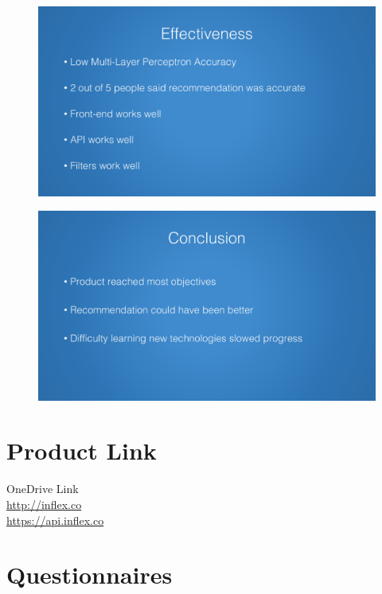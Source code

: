 \documentclass[a4paper,12pt]{report}
\begin{document}
\begin{appendices}
    \begin{figure}[h]
      \centering
      \includegraphics[width=0.9\linewidth]{presentation-8}
    \end{figure}

    \begin{figure}[h]
      \centering
      \includegraphics[width=0.9\linewidth]{presentation-9}
    \end{figure}

  \chapter{Product Link}
    OneDrive Link\\
    \url{http://inflex.co}\\
    \url{https://api.inflex.co}

  \chapter{Questionnaires} \label{app:questionnaires}


\end{appendices}
\end{document}
